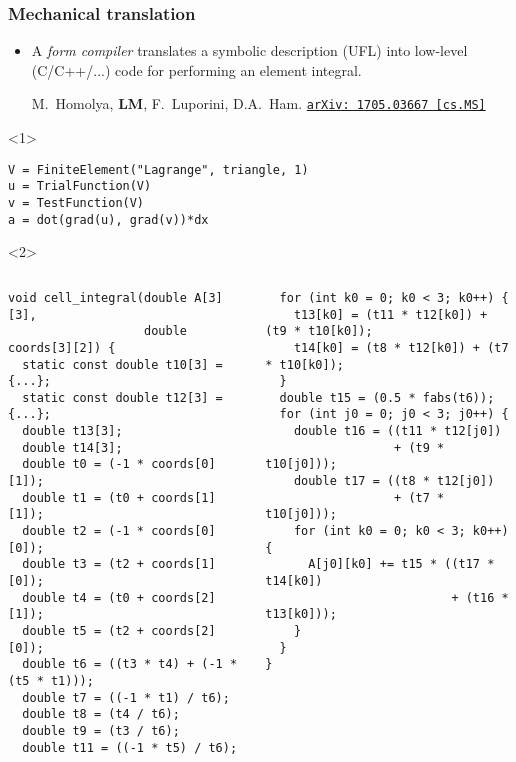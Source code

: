 \documentclass[presentation]{beamer}
\newcommand{\arxivlink}[2]{%
  \href{http://www.arxiv.org/abs/#1}%
  {\texttt{arXiv:\,#1\,[#2]}}%
}
\begin{document}
\begin{frame}[fragile]
  \frametitle{Mechanical translation}
  \begin{itemize}
  \item A \emph{form compiler} translates a symbolic description (UFL) into
    low-level (C/C++/...) code for performing an element integral.
    \begin{flushright}
      {\scriptsize M.~Homolya, \textbf{LM}, F.~Luporini, D.A.~Ham. \arxivlink{1705.03667}{cs.MS}}
    \end{flushright}
  \end{itemize}
  \begin{onlyenv}<1>
\begin{verbatim}
V = FiniteElement("Lagrange", triangle, 1)
u = TrialFunction(V)
v = TestFunction(V)
a = dot(grad(u), grad(v))*dx
\end{verbatim}
  \end{onlyenv}
  \begin{uncoverenv}<2>
    \begin{columns}
      \begin{column}{0.5\textwidth}
\begin{verbatim}
void cell_integral(double A[3][3],
                   double coords[3][2]) {
  static const double t10[3] = {...};
  static const double t12[3] = {...};
  double t13[3];
  double t14[3];
  double t0 = (-1 * coords[0][1]);
  double t1 = (t0 + coords[1][1]);
  double t2 = (-1 * coords[0][0]);
  double t3 = (t2 + coords[1][0]);
  double t4 = (t0 + coords[2][1]);
  double t5 = (t2 + coords[2][0]);
  double t6 = ((t3 * t4) + (-1 * (t5 * t1)));
  double t7 = ((-1 * t1) / t6);
  double t8 = (t4 / t6);
  double t9 = (t3 / t6);
  double t11 = ((-1 * t5) / t6);
\end{verbatim}
      \end{column}
      \begin{column}{0.5\textwidth}
\begin{verbatim}
  for (int k0 = 0; k0 < 3; k0++) {
    t13[k0] = (t11 * t12[k0]) + (t9 * t10[k0]);
    t14[k0] = (t8 * t12[k0]) + (t7 * t10[k0]);
  }
  double t15 = (0.5 * fabs(t6));
  for (int j0 = 0; j0 < 3; j0++) {
    double t16 = ((t11 * t12[j0])
                  + (t9 * t10[j0]));
    double t17 = ((t8 * t12[j0])
                  + (t7 * t10[j0]));
    for (int k0 = 0; k0 < 3; k0++) {
      A[j0][k0] += t15 * ((t17 * t14[k0])
                          + (t16 * t13[k0]));
    }
  }
}
\end{verbatim}
      \end{column}
    \end{columns}
  \end{uncoverenv}
\end{frame}
\end{document}
